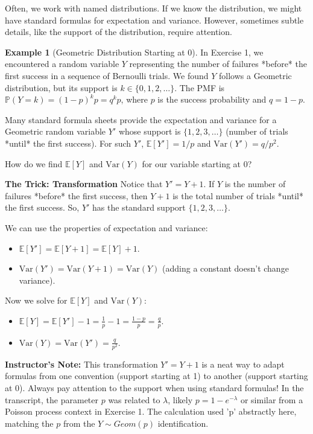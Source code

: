 \documentclass[11pt, letterpaper]{article}
\theoremstyle{plain} %
\theoremstyle{definition} %
\newtheorem{example}[theorem]{Example}
\theoremstyle{remark} %
\newenvironment{instructorcomment}
  {\par\medskip\noindent\begin{framed}\textbf{Instructor's Note:} \normalfont}
  {\end{framed}\medskip}
\newcommand{\E}{\mathbb{E}}
\newcommand{\Var}{\mathrm{Var}}
\newcommand{\Prob}{\mathbb{P}}
\begin{document}
Often, we work with named distributions. If we know the distribution, we might have standard formulas for expectation and variance. However, sometimes subtle details, like the support of the distribution, require attention.

\begin{example}[Geometric Distribution Starting at 0] \label{ex:geom}
In Exercise 1, we encountered a random variable $Y$ representing the number of failures *before* the first success in a sequence of Bernoulli trials. We found $Y$ follows a Geometric distribution, but its support is $k \in \{0, 1, 2, \dots\}$. The PMF is $\Prob(Y=k) = (1-p)^k p = q^k p$, where $p$ is the success probability and $q=1-p$.

Many standard formula sheets provide the expectation and variance for a Geometric random variable $Y'$ whose support is $\{1, 2, 3, \dots\}$ (number of trials *until* the first success). For such $Y'$, $\E[Y'] = 1/p$ and $\Var(Y') = q/p^2$.

How do we find $\E[Y]$ and $\Var(Y)$ for our variable starting at 0?

\textbf{The Trick: Transformation}
Notice that $Y' = Y + 1$. If $Y$ is the number of failures *before* the first success, then $Y+1$ is the total number of trials *until* the first success.
So, $Y'$ has the standard support $\{1, 2, 3, \dots\}$.

We can use the properties of expectation and variance:
\begin{itemize}
    \item $\E[Y'] = \E[Y+1] = \E[Y] + 1$.
    \item $\Var(Y') = \Var(Y+1) = \Var(Y)$ (adding a constant doesn't change variance).
\end{itemize}
Now we solve for $\E[Y]$ and $\Var(Y)$:
\begin{itemize}
    \item $\E[Y] = \E[Y'] - 1 = \frac{1}{p} - 1 = \frac{1-p}{p} = \frac{q}{p}$.
    \item $\Var(Y) = \Var(Y') = \frac{q}{p^2}$.
\end{itemize}

\begin{instructorcomment}
This transformation $Y' = Y+1$ is a neat way to adapt formulas from one convention (support starting at 1) to another (support starting at 0). Always pay attention to the support when using standard formulas! In the transcript, the parameter $p$ was related to $\lambda$, likely $p = 1 - e^{-\lambda}$ or similar from a Poisson process context in Exercise 1. The calculation used 'p' abstractly here, matching the $p$ from the $Y \sim Geom(p)$ identification.
\end{instructorcomment}
\end{example}
\end{document}
